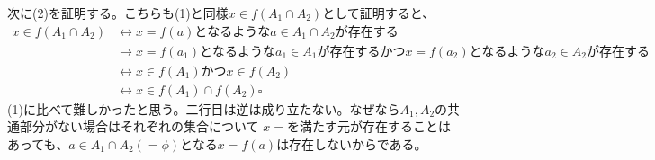 \documentclass[a4j,dvipdfmx]{jsarticle}
\begin{document}
\newpage
次に(2)を証明する。こちらも(1)と同様$x\in f(A_1\cap A_2)$として証明すると、
\begin{align*}
    x\in f(A_1\cap A_2)
    &\leftrightarrow x=f(a)となるような a\in A_1\cap A_2が存在する\\
    &\rightarrow x=f(a_1)となるようなa_1\in A_1が存在するかつ x=f(a_2)となるようなa_2\in A_2が存在する\\
    &\leftrightarrow x\in f(A_1)かつx\in f(A_2)\\
    &\leftrightarrow x\in f(A_1)\cap f(A_2)\square
\end{align*}
(1)に比べて難しかったと思う。二行目は逆は成り立たない。なぜなら$A_1,A_2$の共通部分がない場合はそれぞれの集合について
$x=$を満たす元が存在することはあっても、$a\in A_1\cap A_2(=\phi)$となる$x=f(a)$は存在しないからである。
\end{document}
